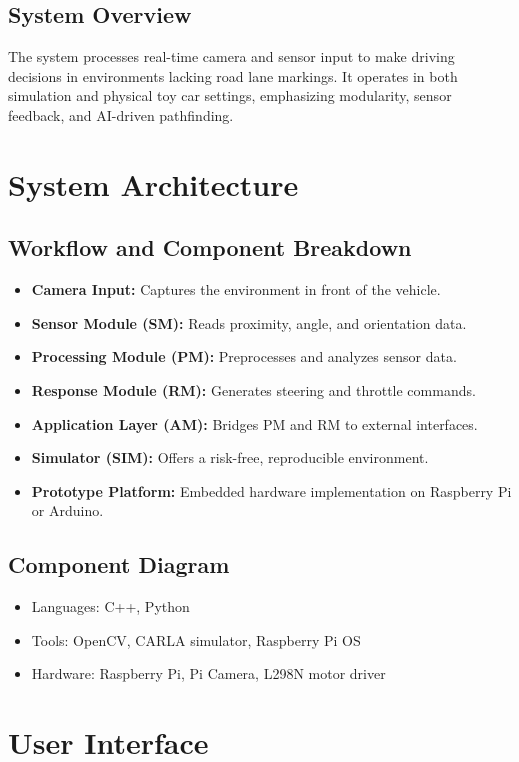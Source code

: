 \documentclass[12pt]{article}
\begin{document}
\subsection{System Overview}
The system processes real-time camera and sensor input to make driving decisions in environments lacking road lane markings. It operates in both simulation and physical toy car settings, emphasizing modularity, sensor feedback, and AI-driven pathfinding.

\section{System Architecture}
\subsection{Workflow and Component Breakdown}
\begin{itemize}
  \item \textbf{Camera Input:} Captures the environment in front of the vehicle.
  \item \textbf{Sensor Module (SM):} Reads proximity, angle, and orientation data.
  \item \textbf{Processing Module (PM):} Preprocesses and analyzes sensor data.
  \item \textbf{Response Module (RM):} Generates steering and throttle commands.
  \item \textbf{Application Layer (AM):} Bridges PM and RM to external interfaces.
  \item \textbf{Simulator (SIM):} Offers a risk-free, reproducible environment.
  \item \textbf{Prototype Platform:} Embedded hardware implementation on Raspberry Pi or Arduino.
\end{itemize}

\subsection{Component Diagram}
\begin{itemize}
  \item Languages: C++, Python
  \item Tools: OpenCV, CARLA simulator, Raspberry Pi OS
  \item Hardware: Raspberry Pi, Pi Camera, L298N motor driver
\end{itemize}

\section{User Interface}
\end{document}
